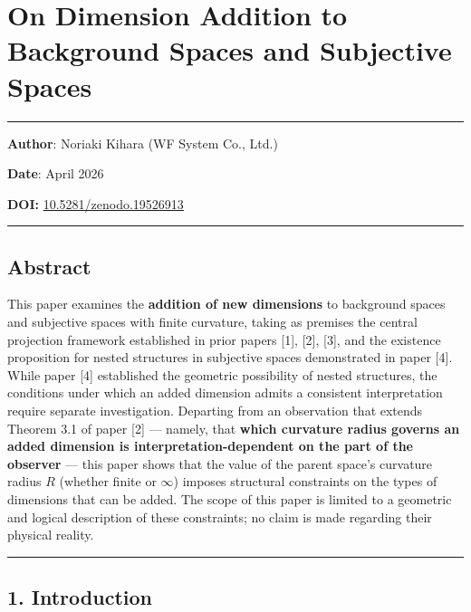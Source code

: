 \documentclass[a4paper,11pt]{article}
\theoremstyle{definition}
\begin{document}
\section{On Dimension Addition to Background Spaces and Subjective Spaces}\label{on-dimension-addition-to-background-spaces-and-subjective-spaces}

\begin{center}\rule{0.5\linewidth}{0.5pt}\end{center}

\textbf{Author}: Noriaki Kihara (WF System Co., Ltd.)

\textbf{Date}: April 2026

\textbf{DOI:} \href{https://doi.org/10.5281/zenodo.19526913}{10.5281/zenodo.19526913}

\begin{center}\rule{0.5\linewidth}{0.5pt}\end{center}

\subsection{Abstract}\label{abstract}

This paper examines the \textbf{addition of new dimensions} to background spaces and subjective spaces with finite curvature, taking as premises the central projection framework established in prior papers {[}1{]}, {[}2{]}, {[}3{]}, and the existence proposition for nested structures in subjective spaces demonstrated in paper {[}4{]}. While paper {[}4{]} established the geometric possibility of nested structures, the conditions under which an added dimension admits a consistent interpretation require separate investigation. Departing from an observation that extends Theorem 3.1 of paper {[}2{]} --- namely, that \textbf{which curvature radius governs an added dimension is interpretation-dependent on the part of the observer} --- this paper shows that the value of the parent space's curvature radius \(R\) (whether finite or \(\infty\)) imposes structural constraints on the types of dimensions that can be added. The scope of this paper is limited to a geometric and logical description of these constraints; no claim is made regarding their physical reality.

\begin{center}\rule{0.5\linewidth}{0.5pt}\end{center}

\subsection{1. Introduction}\label{introduction}
\end{document}
